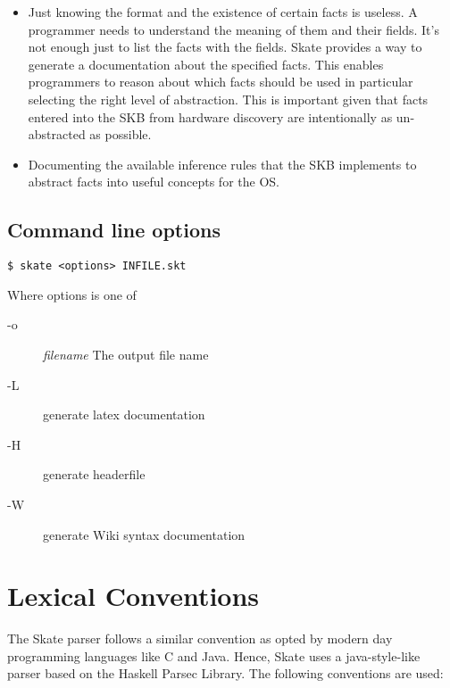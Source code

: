 \documentclass[a4paper,11pt,twoside]{report}
\begin{document}
{{\begin{itemize}
    \item Just knowing the format and the existence of certain facts is 
    useless. A programmer needs to understand the meaning of them and their 
    fields. It's not enough just to list the facts with the fields. Skate 
    provides a way to generate a documentation about the specified facts. This 
    enables programmers to reason about which facts should be used in 
    particular selecting the right level of abstraction. This is important 
    given that facts entered into the SKB from hardware discovery are 
    intentionally as un-abstracted as possible.
    
    \item Documenting the available inference rules that the SKB implements
    to abstract facts into useful concepts for the OS. 
\end{itemize}




\section{Command line options}
\label{sec:cmdline}

\begin{verbatim}
$ skate <options> INFILE.skt
\end{verbatim}


Where options is one of
\begin{description}
  \item[-o] \textit{filename} The output file name
  \item[-L] generate latex documentation
  \item[-H] generate headerfile
  \item[-W] generate Wiki syntax documentation
\end{description}



\chapter{Lexical Conventions}
\label{chap:lexer}

The Skate parser follows a similar convention as opted by modern day 
programming languages like C and Java. Hence, Skate uses a java-style-like
parser based on the Haskell Parsec Library. The following conventions are used:

}}
\end{document}
